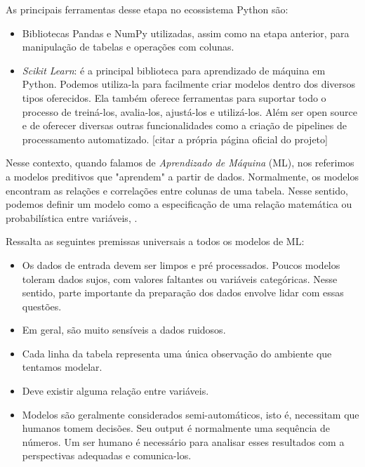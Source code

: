 \documentclass{article}
\begin{document}
As principais ferramentas desse etapa no ecossistema Python são:
\begin{itemize}
\item Bibliotecas Pandas e NumPy utilizadas, assim como na etapa anterior, para manipulação de tabelas e operações com colunas.
\item \textit{Scikit Learn}: é a principal biblioteca para aprendizado de máquina em Python. Podemos utiliza-la para facilmente criar modelos dentro dos diversos tipos oferecidos. Ela também oferece ferramentas para suportar todo o processo de treiná-los, avalia-los, ajustá-los e utilizá-los. Além ser open source e de oferecer diversas outras funcionalidades como a criação de pipelines de processamento automatizado. [citar a própria página oficial do projeto] 
\end{itemize}

Nesse contexto, quando falamos de \textit{Aprendizado de Máquina} (ML), nos referimos a modelos preditivos que "aprendem" a partir de dados. Normalmente, os modelos encontram as relações e correlações entre colunas de uma tabela. Nesse sentido, podemos definir um modelo como a especificação de uma relação matemática ou probabilística entre variáveis,  \cite{SCRATCH} \cite{PRINCIPLES}.

\cite{PRINCIPLES} Ressalta as seguintes premissas universais a todos os modelos de ML:
\begin{itemize}
\item Os dados de entrada devem ser limpos e pré processados. Poucos modelos toleram dados sujos, com valores faltantes ou variáveis categóricas. Nesse sentido, parte importante da preparação dos dados envolve lidar com essas questões.
\item Em geral, são muito sensíveis a dados ruidosos. 
\item Cada linha da tabela representa uma única observação do ambiente que tentamos modelar. 
\item  Deve existir alguma relação entre variáveis.
\item Modelos são geralmente considerados semi-automáticos, isto é, necessitam que humanos tomem decisões. Seu output é normalmente uma sequência de números. Um ser humano é necessário para analisar esses resultados com a perspectivas adequadas e comunica-los.
\end{itemize}
\end{document}
